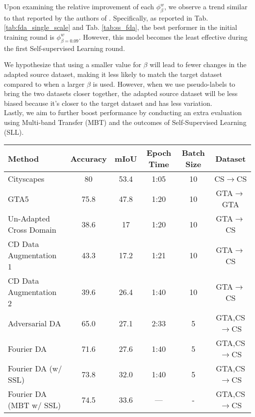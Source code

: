 \documentclass[10pt,twocolumn,letterpaper]{article}
\begin{document}
Upon examining the relative improvement of each $\phi^w_{\beta}$, we observe a trend similar to that reported by the authors of \cite{fda}. Specifically, as reported in Tab. \ref{tab:fda_single_scale} and Tab. \ref{tab:ss_fda}, the best performer in the initial training round is $\phi^w_{{\beta} = 0.09}$. However, this model becomes the least effective during the first Self-supervised Learning round.

We hypothesize that using a smaller value for $\beta$ will lead to fewer changes in the adapted source dataset, making it less likely to match the target dataset compared to when a larger $\beta$ is used. However, when we use pseudo-labels to bring the two datasets closer together, the adapted source dataset will be less biased because it’s closer to the target dataset and has less variation.\\

Lastly, we aim to further boost performance by conducting an extra evaluation using Multi-band Transfer (MBT) and the outcomes of Self-Supervised Learning (SLL).






\begin{table*}
  \centering
  \begin{tabular}{@{}lccccc@{}}
    \toprule
    Method & Accuracy & mIoU & Epoch Time & Batch Size & Dataset\\
    \midrule
    Cityscapes & 80 & 53.4 & 1:05 & 10 & CS$\rightarrow$CS \\
    GTA5 & 75.8 & 47.8 & 1:20 & 10 & GTA$\rightarrow$GTA\\
    Un-Adapted Cross Domain & 38.6 & 17 & 1:20 & 10 & GTA$\rightarrow$CS\\
    CD Data Augmentation 1 & 43.3 & 17.2 & 1:21 & 10 & GTA$\rightarrow$CS\\
    CD Data Augmentation 2 & 39.6 & 26.4 & 1:40 & 10 & GTA$\rightarrow$CS\\
    Adversarial DA & 65.0 & 27.1 & 2:33 & 5 & GTA,CS$\rightarrow$CS\\
    Fourier DA & 71.6 & 27.6 & 1:40 & 5 & GTA,CS$\rightarrow$CS\\
    Fourier DA (w/ SSL)& 73.8 & 32.0 & 1:40 & 5 & GTA,CS$\rightarrow$CS\\
    Fourier DA (MBT w/ SSL)& 74.5 & 33.6 & --- & - & GTA,CS$\rightarrow$CS\\
    \bottomrule
  \end{tabular}
  \caption{}
  \label{tab:result}
\end{table*}
\end{document}
